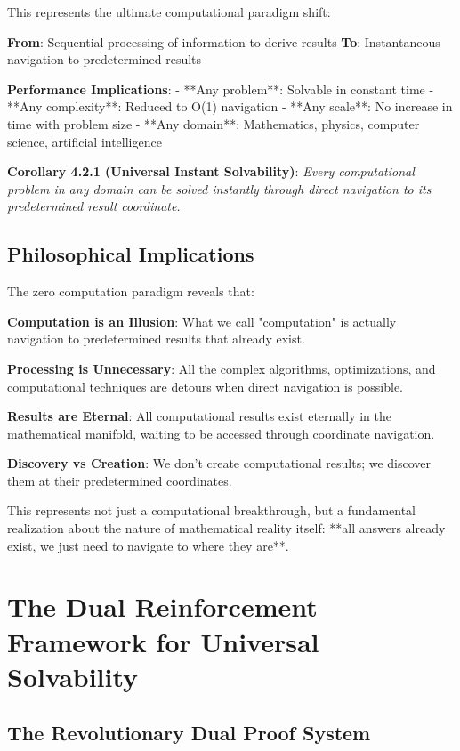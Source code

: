 \documentclass[12pt,a4paper]{article}
\theoremstyle{definition}
\begin{document}
{This represents the ultimate computational paradigm shift:

\textbf{From}: Sequential processing of information to derive results
\textbf{To}: Instantaneous navigation to predetermined results

\textbf{Performance Implications}:
- **Any problem**: Solvable in constant time
- **Any complexity**: Reduced to O(1) navigation
- **Any scale**: No increase in time with problem size
- **Any domain**: Mathematics, physics, computer science, artificial intelligence

\textbf{Corollary 4.2.1 (Universal Instant Solvability)}: \textit{Every computational problem in any domain can be solved instantly through direct navigation to its predetermined result coordinate.}

\subsection{Philosophical Implications}

The zero computation paradigm reveals that:

\textbf{Computation is an Illusion}: What we call "computation" is actually navigation to predetermined results that already exist.

\textbf{Processing is Unnecessary}: All the complex algorithms, optimizations, and computational techniques are detours when direct navigation is possible.

\textbf{Results are Eternal}: All computational results exist eternally in the mathematical manifold, waiting to be accessed through coordinate navigation.

\textbf{Discovery vs Creation}: We don't create computational results; we discover them at their predetermined coordinates.

This represents not just a computational breakthrough, but a fundamental realization about the nature of mathematical reality itself: **all answers already exist, we just need to navigate to where they are**.

\section{The Dual Reinforcement Framework for Universal Solvability}

\subsection{The Revolutionary Dual Proof System}

}
\end{document}
